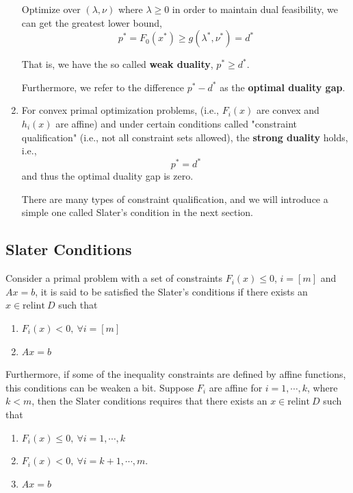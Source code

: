 \begin{enumerate}
	Optimize over $(\lambda, \nu)$ where $\lambda \geq 0$ in order to maintain dual feasibility, we can get the greatest lower bound,
	\begin{equation*}
		p^* = F_0(x^*) \geq g(\lambda^*, \nu^*) = d^*
	\end{equation*}
	
	That is, we have the so called \textbf{weak duality}, $p^*\geq d^*$. 
	
	Furthermore, we refer to the difference $p^* - d^*$ as the \textbf{optimal duality gap}.
	
	
	\item For convex primal optimization problems, (i.e., $F_i(x)$ are convex and $h_i(x)$ are affine) and under certain conditions called "constraint qualification" (i.e., not all constraint sets allowed), the \textbf{strong duality} holds, i.e.,
	$$p^* = d^*$$
	and thus the optimal duality gap is zero.
	
	There are many types of constraint qualification, and we will introduce a simple one called Slater's condition in the next section.
	
\end{enumerate}
	


\subsection{Slater Conditions}

\begin{definition}
	Consider a primal problem with a set of constraints $F_i(x)\leq 0$, $i = [m]$ and $Ax = b$, it is said to be satisfied the Slater's conditions if there exists an $x\in\text{relint}\ D$ such that
	
	\begin{enumerate}
		\item $F_i(x) < 0,\ \forall i = [m]$
		
		\item $Ax = b$
	\end{enumerate}
	
	Furthermore, if some of the inequality constraints are defined by affine functions, this conditions can be weaken a bit. Suppose $F_i$ are affine for $i=1,\cdots, k$, where $k<m$, then the Slater conditions requires that there exists an $x\in\text{relint}\ D$ such that
	\begin{enumerate}
		\item $F_i(x) \leq 0,\ \forall i = 1,\cdots, k$
		\item $F_i(x) < 0,\ \forall i = k+1,\cdots, m$.
		\item $Ax = b$
	\end{enumerate}
	
\end{definition}

